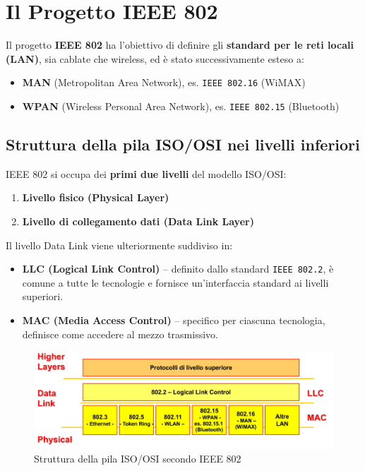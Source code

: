 \section{Il Progetto IEEE 802}

Il progetto \textbf{IEEE 802} ha l’obiettivo di definire gli \textbf{standard per le reti locali (LAN)}, sia cablate che wireless, ed è stato successivamente esteso a:

\begin{itemize}
    \item \textbf{MAN} (Metropolitan Area Network), es. \texttt{IEEE 802.16} (WiMAX)
    \item \textbf{WPAN} (Wireless Personal Area Network), es. \texttt{IEEE 802.15} (Bluetooth)
\end{itemize}

\subsection*{Struttura della pila ISO/OSI nei livelli inferiori}
IEEE 802 si occupa dei \textbf{primi due livelli} del modello ISO/OSI:
\begin{enumerate}
    \item \textbf{Livello fisico (Physical Layer)}
    \item \textbf{Livello di collegamento dati (Data Link Layer)}
\end{enumerate}

Il livello Data Link viene ulteriormente suddiviso in:
\begin{itemize}
    \item \textbf{LLC (Logical Link Control)} -- definito dallo standard \texttt{IEEE 802.2}, è comune a tutte le tecnologie e fornisce un'interfaccia standard ai livelli superiori.
    \item \textbf{MAC (Media Access Control)} -- specifico per ciascuna tecnologia, definisce come accedere al mezzo trasmissivo.
\end{itemize}

\begin{figure}[h!]
    \centering
    \includegraphics[width=1\textwidth]{images/ieee802.png}
    \caption{Struttura della pila ISO/OSI secondo IEEE 802}
    \label{fig:ieee802}
\end{figure}

